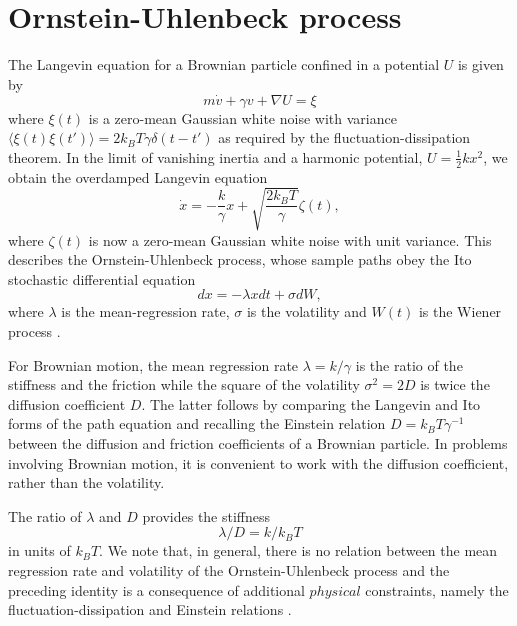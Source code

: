 \documentclass[english,aps, onecolumn, prl,superscriptaddress, notitlepage]{revtex4-1}
\begin{document}
\section{Ornstein-Uhlenbeck process\label{sec:Ornstein-Uhlenbeck-process}}

The Langevin equation for a Brownian particle confined in a potential
$U$ is given by 
\begin{equation}
m\dot{v}+\gamma v+\nabla U=\xi
\end{equation}
where $\xi(t)$ is a zero-mean Gaussian white noise with variance
$\langle\xi(t)\xi(t')\rangle=2k_{B}T\gamma\delta(t-t')$ as required
by the fluctuation-dissipation theorem. In the limit of vanishing
inertia and a harmonic potential, $U=\frac{{1}}{2}kx^{2}$, we obtain
the overdamped Langevin equation 
\begin{equation}
\dot{x}=-\frac{k}{\gamma}x+\sqrt{\frac{2k_{B}T}{\gamma}}\zeta(t),
\end{equation}
where $\zeta(t)$ is now a zero-mean Gaussian white noise with unit
variance. This describes the Ornstein-Uhlenbeck process, whose sample
paths obey the Ito stochastic differential equation 
\begin{equation}
dx=-\lambda xdt+\sigma dW,
\end{equation}
where $\lambda$ is the mean-regression rate, $\sigma$ is the volatility
and $W(t)$ is the Wiener process \cite{gardiner1985handbook}. 

For Brownian motion, the mean regression rate $\lambda=k/\gamma$
is the ratio of the stiffness and the friction while the square of
the volatility $\sigma^{2}=2D$ is twice the diffusion coefficient
$D$. The latter follows by comparing the Langevin and Ito forms of
the path equation and recalling the Einstein relation $D=k_{B}T\gamma^{-1}$
between the diffusion and friction coefficients of a Brownian particle.
In problems involving Brownian motion, it is convenient to work with
the diffusion coefficient, rather than the volatility. 

The ratio of $\lambda$ and $D$ provides the stiffness 
\begin{equation}
\lambda/D=k/k_{B}T
\end{equation}
in units of $k_{B}T$. We note that, in general, there is no relation
between the mean regression rate and volatility of the Ornstein-Uhlenbeck
process and the preceding identity is a consequence of additional
$physical$ constraints, namely the fluctuation-dissipation and Einstein
relations \cite{kubo1966fluctuation}. 
\end{document}

